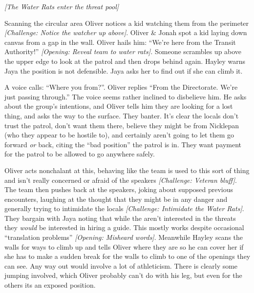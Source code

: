 \textit{{[}The Water Rats enter the threat pool{]}}



Scanning the circular area Oliver notices a kid watching them from the perimeter\textit{ {[}Challenge: Notice the watcher up above{]}}.  Oliver \& Jonah spot a kid laying down canvas from a gap in the wall.  Oliver hails him: ``We're here from the Transit Authority!''\textit{ {[}Opening: Reveal team to water rats{]}.}  Someone scrambles up above the upper edge to look at the patrol and then drops behind again.  Hayley warns Jaya the position is not defensible.  Jaya asks her to find out if she can climb it.



A voice calls: ``Where you from?''.  Oliver replies ``From the Directorate.  We're just passing through.''  The voice seems rather inclined to disbelieve him.  He asks about the group's intentions, and Oliver tells him they are looking for a lost thing, and asks the way to the surface.  They banter.  It's clear the locals don't trust the patrol, don't want them there, believe they might be from Nicklepan (who they appear to be hostile to), and certainly aren't going to let them go forward\textit{ or} back, citing the ``bad position'' the patrol is in.  They want payment for the patrol to be allowed to go anywhere safely.



Oliver acts nonchalant at this, behaving like the team is used to this sort of thing and isn't really concerned or afraid of the speakers\textit{ {[}Challenge: Veteran bluff{]}}.  The team then pushes back at the speakers, joking about supposed previous encounters, laughing at the thought that they might be in any danger and generally trying to intimidate the locals\textit{ {[}Challenge: Intimidate the Water Rats{]}}.  They bargain with Jaya noting that while the aren't interested in the threats they\textit{ would} be interested in hiring a guide.  This mostly works despite occasional ``translation problems''\textit{ {[}Opening: Misheard words{]}}.  Meanwhile Hayley scans the walls for ways to climb up and tells Oliver where they are so he can cover her if she has to make a sudden break for the walls to climb to one of the openings they can see.  Any way out would involve a lot of athleticism.  There is clearly some jumping involved, which Oliver probably can't do with his leg, but even for the others its an exposed position.




